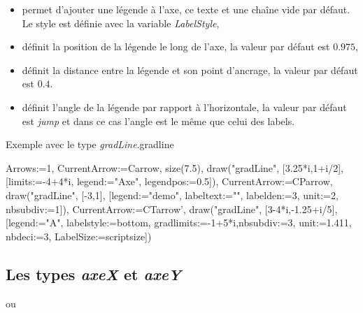 \begin{itemize}
\begin{itemize}
  \item {} permet d'ajouter une légende à l'axe, ce texte et une chaîne vide par défaut. Le style est définie avec la variable \emph{LabelStyle},
  \item {} définit la position de la légende le long de l'axe, la valeur par défaut est $0.975$,
  \item {} définit la distance entre la légende et son point d'ancrage, la valeur par défaut est $0.4$.
  \item {} définit l'angle de la légende par rapport à l'horizontale, la valeur par défaut est \emph{jump} et dans ce cas l'angle est le même que celui des labels.
  \end{itemize}
\end{itemize}

\begin{demo}{Exemple avec le type \emph{gradLine}.}{gradline}
\begin{texgraph}[name=gradline]
Arrows:=1, CurrentArrow:=Carrow, size(7.5),
draw("gradLine", [3.25*i,1+i/2], [limits:=-4+4*i, 
 legend:="Axe", legendpos:=0.5]),
CurrentArrow:=CParrow,
draw("gradLine", [-3,1], [legend:="demo", labeltext:="\pi",
 labelden:=3, unit:=2, nbsubdiv:=1]),
CurrentArrow:=CTarrow',
draw("gradLine", [3-4*i,-1.25+i/5], [legend:="A", 
 labelstyle:=bottom, gradlimits:=-1+5*i,nbsubdiv:=3, 
 unit:=1.411, nbdeci:=3, LabelSize:=scriptsize])
\end{texgraph}
\end{demo}

\subsection{Les types \emph{axeX} et \emph{axeY}}

{\centering {} ou \par}

